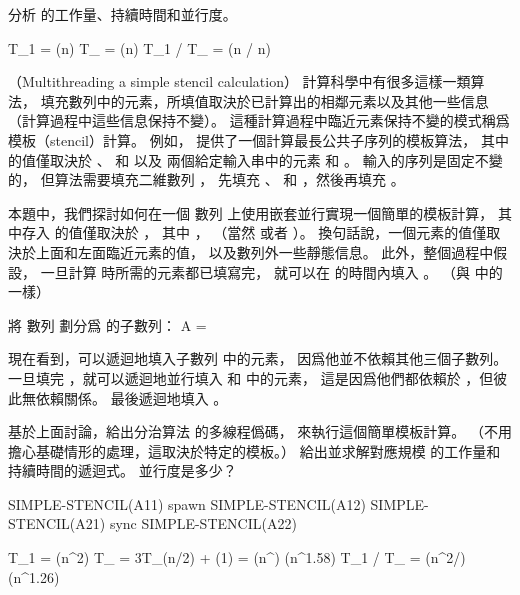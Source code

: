 \startigBase[continue]\startitem
分析  的工作量、持續時間和並行度。
\stopitem\stopigBase

\startANSWER
\startformula\startmathalignment
\NC T_1 \NC = \Theta(n) \NR
\NC T_{\infty} \NC = \Theta(\lg n) \NR
\NC T_1 / T_{\infty} \NC = \Theta(n / \lg n) \NR
\stopmathalignment\stopformula
\stopANSWER

\stopPROBLEM

\startPROBLEM
（Multithreading a simple stencil calculation）
計算科學中有很多這樣一類算法，
填充數列中的元素，所填值取決於已計算出的相鄰元素以及其他一些信息
（計算過程中這些信息保持不變）。
這種計算過程中臨近元素保持不變的模式稱爲{\EMP 模板（stencil）}計算。
例如， 提供了一個計算最長公共子序列的模板算法，
其中  的值僅取決於 、  和  以及
兩個給定輸入串中的元素  和 。
輸入的序列是固定不變的，
但算法需要填充二維數列 ，
先填充 、  和 ，然後再填充 。

本題中，我們探討如何在一個  數列  上使用嵌套並行實現一個簡單的模板計算，
其中存入  的值僅取決於 ，
其中 ，  （當然  或者 ）。
換句話說，一個元素的值僅取決於上面和左面臨近元素的值，
以及數列外一些靜態信息。
此外，整個過程中假設，
一旦計算  時所需的元素都已填寫完，
就可以在  的時間內填入 。
（與 中的  一樣）

將  數列  劃分爲  的子數列：
\startformula
A = 
\stopformula

現在看到，可以遞迴地填入子數列  中的元素，
因爲他並不依賴其他三個子數列。
一旦填完 ，就可以遞迴地並行填入  和  中的元素，
這是因爲他們都依賴於 ，但彼此無依賴關係。
最後遞迴地填入 。

\startigBase[a]\startitem
基於上面討論，給出分治算法  的多線程僞碼，
來執行這個簡單模板計算。
（不用擔心基礎情形的處理，這取決於特定的模板。）
給出並求解對應規模  的工作量和持續時間的遞迴式。
並行度是多少？
\stopitem\stopigBase

\startANSWER
{}
\startCLRS
SIMPLE-STENCIL(A11)
spawn SIMPLE-STENCIL(A12)
SIMPLE-STENCIL(A21)
sync
SIMPLE-STENCIL(A22)
\stopCLRS

\startformula\startmathalignment
\NC T_1 \NC = \Theta(n^2) \NR
\NC T_{\infty} \NC = 3T_{\infty}(n/2) + \Theta(1) = \Theta(n^{}) \approx \Theta(n^{1.58}) \NR
\NC T_1 / T_{\infty} \NC = \Theta(n^{2/}) \approx \Theta(n^{1.26}) \NR
\stopmathalignment\stopformula
\stopANSWER

